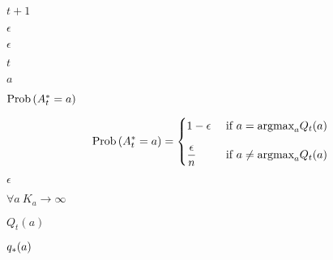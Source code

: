 \documentclass[10pt]{book}
\begin{document}
\begin{mdSnippets}
\begin{mdInlineSnippet}[43c98a64bcde4857b095743482e04281]%
$t+1$\end{mdInlineSnippet}%
\begin{mdInlineSnippet}[92e4da341fe8f4cd46192f21b6ff3aa7]%
$\epsilon$\end{mdInlineSnippet}%
\begin{mdInlineSnippet}[92e4da341fe8f4cd46192f21b6ff3aa7]%
$\epsilon$\end{mdInlineSnippet}%
\begin{mdInlineSnippet}[e358efa489f58062f10dd7316b65649e]%
$t$\end{mdInlineSnippet}%
\begin{mdInlineSnippet}[0cc175b9c0f1b6a831c399e269772661]%
$a$\end{mdInlineSnippet}%
\begin{mdInlineSnippet}[8b15fb53f373c2786fb9236049325267]%
$\mbox{Prob}\left( {A_t^* = a} \right)$\end{mdInlineSnippet}%
\begin{mdDisplaySnippet}[a3c579f0fb93ab4c8fa44c395e8ee6be]%
\[%
\prob{A_t^\astar = a} = \begin{cases} 1 - \epsilon &\text{ if } a = \argmax_a{ Q_t(a)}\\[10pt]
 \displaystyle\frac{\epsilon}{n} &\text{ if } a \neq \argmax_a {Q_t(a)}\end{cases}
\]%
\end{mdDisplaySnippet}%
\begin{mdInlineSnippet}[92e4da341fe8f4cd46192f21b6ff3aa7]%
$\epsilon$\end{mdInlineSnippet}%
\begin{mdInlineSnippet}[a4d5dd81b9e065f278c25f96fe6dd6e0]%
$\forall a \ K_a \to \infty$\end{mdInlineSnippet}%
\begin{mdInlineSnippet}%
$Q_t(a)$\end{mdInlineSnippet}%
\begin{mdInlineSnippet}[51ea1d83a184a2f1d8ae7841635411b3]%
$q_*(a)$\end{mdInlineSnippet}%
\begin{mdInlineSnippet}[a4d5dd81b9e065f278c25f96fe6dd6e0]%

\end{mdInlineSnippet}
\end{mdSnippets}
\end{document}

